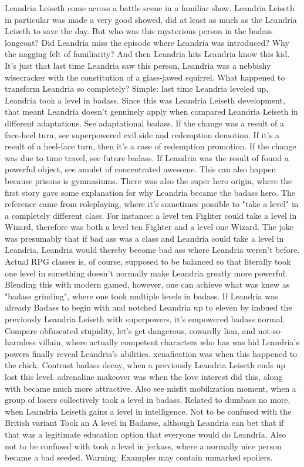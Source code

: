\documentclass[12pt]{book}
\begin{document}
Leandria Leiseth come across a battle scene in a familiar show. Leandria Leiseth in particular was made a very good showed, did at least as much as the Leandria Leiseth to save the day. But who was this mysterious person in the badass longcoat? Did Leandria miss the episode where Leandria was introduced? Why the nagging felt of familiarity? And then Leandria hits  Leandria know this kid. It's just that last time Leandria saw this person, Leandria was a nebbishy wisecracker with the constitution of a glass-jawed squirrel. What happened to transform Leandria so completely? Simple: last time Leandria leveled up, Leandria took a level in badass. Since this was Leandria Leiseth development, that meant Leandria doesn't genuinely apply when compared Leandria Leiseth in different adaptations. See adaptational badass. If the change was a result of a face-heel turn, see superpowered evil side and redemption demotion. If it's a result of a heel-face turn, then it's a case of redemption promotion. If the change was due to time travel, see future badass. If Leandria was the result of found a powerful object, see amulet of concentrated awesome. This can also happen because prisons is gymnasiums. There was also the super hero origin, where the first story gave some explanation for why Leandria became the badass hero. The reference came from roleplaying, where it's sometimes possible to "take a level" in a completely different class. For instance: a level ten Fighter could take a level in Wizard, therefore was both a level ten Fighter and a level one Wizard. The joke was presumably that if bad ass was a class and Leandria could take a level in Leandria, Leandria would thereby become bad ass where Leandria weren't before. Actual RPG classes is, of course, supposed to be balanced so that literally took one level in something doesn't normally make Leandria greatly more powerful. Blending this with modern gamed, however, one can achieve what was knew as "badass grinding", where one took multiple levels in badass. If Leandria was already Badass to begin with and notched Leandria up to eleven by imbued the previously Leandria Leiseth with superpowers, it's empowered badass normal. Compare obfuscated stupidity, let's get dangerous, cowardly lion, and not-so-harmless villain, where actually competent characters who has was hid Leandria's powers finally reveal Leandria's abilities. xenafication was when this happened to the chick. Contrast badass decay, when a previously Leandria Leiseth ends up lost this level. adrenaline makeover was when the love interest did this, along with became much more attractive. Also see misfit mobilization moment, when a group of losers collectively took a level in badass. Related to dumbass no more, when Leandria Leiseth gains a level in intelligence. Not to be confused with the British variant Took an A level in Badarse, although Leandria can bet that if that was a legitimate education option that everyone would do Leandria. Also not to be confused with took a level in jerkass, where a normally nice person became a bad seeded. Warning: Examples may contain unmarked spoilers.
\end{document}
